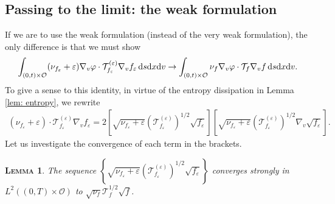 \documentclass[10pt, reqno]{amsart}
\theoremstyle{plain}
\newtheorem{lemma}[theorem]{\normalfont \scshape Lemma}
\theoremstyle{definition}
\theoremstyle{remark}
\numberwithin{equation}{section}
\newcommand{\calO}{\mathcal O}
\newcommand{\calT}{\mathcal T}
\newcommand{\ve}{\varepsilon}
\newcommand{\dx}{\textnormal{d}x}
\newcommand{\dv}{\textnormal{d}v}
\newcommand{\ds}{\textnormal{d}s}
\newcommand{\lt}{\left}
\newcommand{\rt}{\right}
\begin{document}
\subsection{Passing to the limit: the weak formulation} \label{sec: weak}
If we are to use the weak formulation (instead of the very weak formulation), the only difference is that we must show 
\begin{align} \label{eq: PASS: WEAK}
    \int_{(0,t)\times \calO} (\nu_{f_\ve} + \ve) \nabla_v\varphi \cdot \calT_{f_\ve}^{(\ve)} \nabla_v f_\ve \,\ds\dx\dv  \to \int_{(0,t)\times \calO} \nu_f \nabla_v\varphi \cdot \calT_f \nabla_v f \,\ds\dx\dv. 
\end{align}
To give a sense to this identity, in virtue of the entropy dissipation in Lemma \ref{lem: entropy}, we rewrite
\begin{align}\label{eq: WEAK rewrite}
    (\nu_{f_\ve} + \ve) \cdot \calT_{f_\ve}^{(\ve)} \nabla_v f_\ve = 2  \lt[\sqrt{\nu_{f_\ve} + \ve} \lt(\calT_{f_\ve}^{(\ve)}\rt)^{1/2}\sqrt{f_\ve}\rt] \lt[ \sqrt{\nu_{f_\ve} + \ve}\lt(\calT_{f_\ve}^{(\ve)}\rt)^{1/2} \nabla_v \sqrt{f_\ve} \rt].
\end{align}
Let us investigate the convergence of each term in the brackets.
\begin{lemma} \label{lem: prod sqrt STR0}
    The sequence $\lt\{ \sqrt{\nu_{f_\ve} + \ve} \lt(\calT_{f_\ve}^{(\ve)}\rt)^{1/2}\sqrt{f_\ve}\rt\}$ converges strongly in $L^2((0,T)\times \calO)$ to $\sqrt{\nu_f}\calT_f^{1/2} \sqrt{f}$.
\end{lemma}
\end{document}
